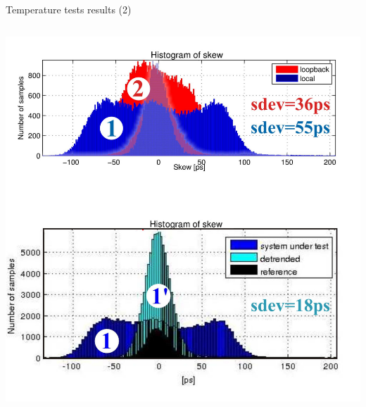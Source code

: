 \documentclass[compress,red]{beamer}
\begin{document}
\begin{frame}{Temperature tests results (2)}
\begin{columns}[c]
		\hspace{-0.8cm}
		\begin{center}
		\includegraphics[width=1.13\textwidth]{measurements/tempTests-2-combo-detrended.pdf}
		\end{center}



\end{columns}
\end{frame}
\end{document}

